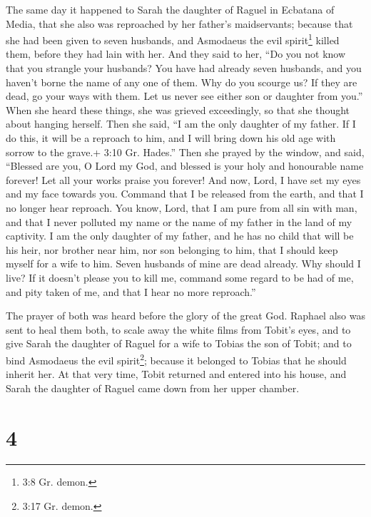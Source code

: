  The same day it happened to Sarah the daughter of Raguel in
Ecbatana of Media, that she also was reproached by her father's
maidservants;  because that she had been given to seven
husbands, and Asmodaeus the evil spirit\footnote{3:8 Gr. demon.} killed
them, before they had lain with her. And they said to her, ``Do you not
know that you strangle your husbands? You have had already seven
husbands, and you haven't borne the name of any one of them.
 Why do you scourge us? If they are dead, go your ways with
them. Let us never see either son or daughter from you.'' 
When she heard these things, she was grieved exceedingly, so that she
thought about hanging herself. Then she said, ``I am the only daughter
of my father. If I do this, it will be a reproach to him, and I will
bring down his old age with sorrow to the grave.+ 3:10 Gr. Hades.''
 Then she prayed by the window, and said, ``Blessed are
you, O Lord my God, and blessed is your holy and honourable name
forever! Let all your works praise you forever!  And now,
Lord, I have set my eyes and my face towards you.  Command
that I be released from the earth, and that I no longer hear reproach.
 You know, Lord, that I am pure from all sin with man,
 and that I never polluted my name or the name of my father
in the land of my captivity. I am the only daughter of my father, and he
has no child that will be his heir, nor brother near him, nor son
belonging to him, that I should keep myself for a wife to him. Seven
husbands of mine are dead already. Why should I live? If it doesn't
please you to kill me, command some regard to be had of me, and pity
taken of me, and that I hear no more reproach.''

 The prayer of both was heard before the glory of the great
God.  Raphael also was sent to heal them both, to scale
away the white films from Tobit's eyes, and to give Sarah the daughter
of Raguel for a wife to Tobias the son of Tobit; and to bind Asmodaeus
the evil spirit\footnote{3:17 Gr. demon.}; because it belonged to Tobias
that he should inherit her. At that very time, Tobit returned and
entered into his house, and Sarah the daughter of Raguel came down from
her upper chamber.

\hypertarget{section-3}{%
\section{4}\label{section-3}}

